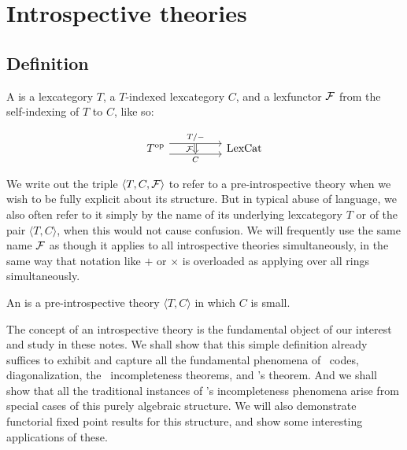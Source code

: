 \section{Introspective theories}

\subsection{Definition}

\begin{definition} \label{DefnPreIntrospIndexed}
A  is a lexcategory $T$, a $T$-indexed lexcategory $C$, and a lexfunctor $\mathcal{F}$ from the self-indexing of $T$ to $C$, like so:

\[\begin{tikzcd}
	{\op{T}} && {\LexCat}
	\arrow["{T/-}"{name=0}, from=1-1, to=1-3, shift left=2]
	\arrow["{C}"{name=1, swap}, from=1-1, to=1-3, shift right=2]
	\arrow[Rightarrow, "{\introF}"', from=0, to=1]
\end{tikzcd}\]
\end{definition}

We write out the triple $\langle T, C, \mathcal{F} \rangle$ to refer to a pre-introspective theory when we wish to be fully explicit about its structure. But in typical abuse of language, we also often refer to it simply by the name of its underlying lexcategory $T$ or of the pair $\langle T, C \rangle$, when this would not cause confusion. We will frequently use the same name $\mathcal{F}$ as though it applies to all introspective theories simultaneously, in the same way that notation like $+$ or $\times$ is overloaded as applying over all rings simultaneously.

\begin{definition} \label{DefnIntrospIndexed}
An  is a pre-introspective theory $\langle T, C \rangle$ in which $C$ is small.
\end{definition}

The concept of an introspective theory is the fundamental object of our interest and study in these notes. We shall show that this simple definition already suffices to exhibit and capture all the fundamental phenomena of \Goedel\ codes, diagonalization, the \Goedel\ incompleteness theorems, and \Loeb's theorem. And we shall show that all the traditional instances of \Goedel's incompleteness phenomena arise from special cases of this purely algebraic structure. We will also demonstrate functorial fixed point results for this structure, and show some interesting applications of these.

